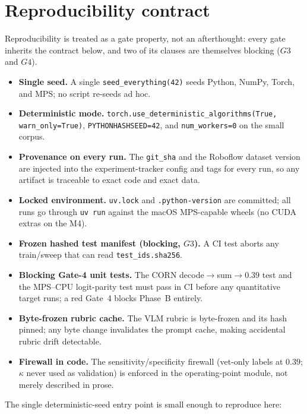 \section{Reproducibility contract}
\label{sec:repro}

Reproducibility is treated as a gate property, not an afterthought: every gate inherits the
contract below, and two of its clauses are themselves blocking ($G3$ and $G4$).

\begin{itemize}
  \item \textbf{Single seed.} A single \texttt{seed\_everything(42)} seeds Python, NumPy,
        Torch, and MPS; no script re-seeds ad hoc.
  \item \textbf{Deterministic mode.} \texttt{torch.use\_deterministic\_algorithms(True,
        warn\_only=True)}, \texttt{PYTHONHASHSEED=42}, and \texttt{num\_workers=0} on the small
        corpus.
  \item \textbf{Provenance on every run.} The \texttt{git\_sha} and the Roboflow dataset
        version are injected into the experiment-tracker config and tags for every run, so any
        artifact is traceable to exact code and exact data.
  \item \textbf{Locked environment.} \texttt{uv.lock} and \texttt{.python-version} are
        committed; all runs go through \texttt{uv run} against the macOS MPS-capable wheels (no
        CUDA extras on the M4).
  \item \textbf{Frozen hashed test manifest (blocking, $G3$).} A CI test aborts any
        train/sweep that can read \texttt{test\_ids.sha256}.
  \item \textbf{Blocking Gate-4 unit tests.} The CORN decode$\to$sum$\to 0.39$ test and the
        MPS--CPU logit-parity test must pass in CI before any quantitative target runs; a red
        Gate~4 blocks Phase~B entirely.
  \item \textbf{Byte-frozen rubric cache.} The VLM rubric is byte-frozen and its hash pinned;
        any byte change invalidates the prompt cache, making accidental rubric drift
        detectable.
  \item \textbf{Firewall in code.} The sensitivity/specificity firewall (vet-only labels at
        $0.39$; $\kappa$ never used as validation) is enforced in the operating-point module,
        not merely described in prose.
\end{itemize}

The single deterministic-seed entry point is small enough to reproduce here:


